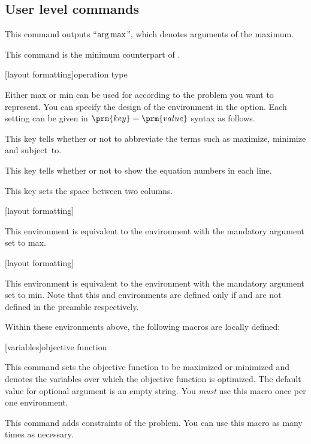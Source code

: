 \documentclass[a4paper,10pt]{article}
\begin{document}
\subsection{User level commands}
\begin{ltxsyntax}
    \par
    This command outputs ``$\operatorname*{arg\,max}$'', which denotes arguments of the maximum.

    \par
    This command is the minimum counterpart of \texttt{\string\argmax}.

    [layout formatting]{operation type}\par
    Either \mbox{\verbatimfont max} or \mbox{\verbatimfont min} can be used for  according to the problem you want to represent.
    You can specify the design of the environment in the  option.
    Each setting can be given in $\prm{key}=\prm{value}$ syntax as follows.

    \begin{optionlist}
        This key tells whether or not to abbreviate the terms such as maximize, minimize and subject~to.

        This key tells whether or not to show the equation numbers in each line.

        This key sets the space between two columns.
    \end{optionlist}

    [layout formatting]\par
    This environment is equivalent to the  environment with the mandatory argument set to \mbox{\verbatimfont max}.

    [layout formatting]\par
    This environment is equivalent to the  environment with the mandatory argument set to \mbox{\verbatimfont min}.
    Note that this and  environments are defined only if  and  are not defined in the preamble respectively.
\end{ltxsyntax}

Within these environments above, the following macros are locally defined:
\begin{ltxsyntax}
    [variables]{objective function}\par
    This command sets the objective function to be maximized or minimized and denotes the variables over which the objective function is optimized.
    The default value for optional argument is an empty string.
    You \emph{must} use this macro once per one environment.

    \par
    This command adds constraints of the problem.
    You can use this macro as many times as necessary.
\end{ltxsyntax}
\end{document}
